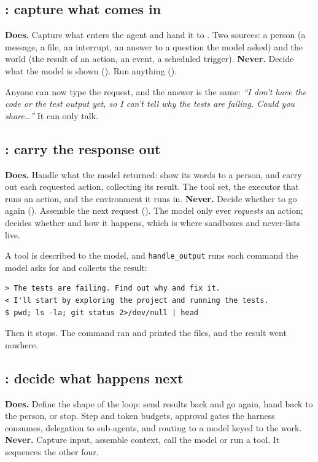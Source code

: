 \subsection{: capture what comes in}
\textbf{Does.} Capture what enters the agent and hand it to . Two sources: a person (a message, a file, an interrupt, an answer to a question the model asked) and the world (the result of an action, an event, a scheduled trigger).
\textbf{Never.} Decide what the model is shown (). Run anything ().


Anyone can now type the request, and the answer is the same: \emph{``I don't have the code or the test output yet, so I can't tell why the tests are failing. Could you share\ldots''} It can only talk.

\subsection{: carry the response out}
\textbf{Does.} Handle what the model returned: show its words to a person, and carry out each requested action, collecting its result. The tool set, the executor that runs an action, and the environment it runs in.
\textbf{Never.} Decide whether to go again (). Assemble the next request (). The model only ever \emph{requests} an action;  decides whether and how it happens, which is where sandboxes and never-lists live.


A tool is described to the model, and \texttt{handle\_output} runs each command the model asks for and collects the result:
\begin{lstlisting}[language={},basicstyle=\ttfamily\scriptsize,breaklines=true,breakindent=1.5em,frame=none,commentstyle=\ttfamily,keywordstyle=\ttfamily,stringstyle=\ttfamily]
> The tests are failing. Find out why and fix it.
< I'll start by exploring the project and running the tests.
$ pwd; ls -la; git status 2>/dev/null | head
\end{lstlisting}
Then it stops. The command ran and printed the files, and the result went nowhere.

\subsection{: decide what happens next}
\textbf{Does.} Define the shape of the loop: send results back and go again, hand back to the person, or stop. Step and token budgets, approval gates the harness consumes, delegation to sub-agents, and routing to a model keyed to the work.
\textbf{Never.} Capture input, assemble context, call the model or run a tool. It sequences the other four.

